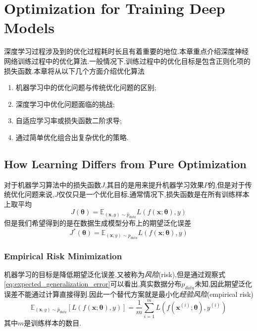 \chapter{Optimization for Training Deep Models}

深度学习过程涉及到的优化过程耗时长且有着重要的地位.本章重点介绍深度神经网络训练过程中的优化算法.一般情况下,训练过程中的优化目标是包含正则化项的损失函数.本章将从以下几个方面介绍优化算法
\begin{enumerate}
    \item 机器学习中的优化问题与传统优化问题的区别;
    \item 深度学习中优化问题面临的挑战;
    \item 自适应学习率或损失函数二阶求导;
    \item 通过简单优化组合出复杂优化的策略.
\end{enumerate}

\section{How Learning Differs from Pure Optimization}

对于机器学习算法中的损失函数$J$,其目的是用来提升机器学习效果$P$的,但是对于传统优化问题来说,$J$仅仅只是一个优化目标.通常情况下,损失函数是在所有训练样本上取平均
\begin{equation}
J(\bm\theta)=\mathbb E_{(\bm x,y)\sim\hat p_{data}}L(f(\bm x;\bm\theta),y)
\end{equation}
但是我们希望得到的是在数据生成模型分布上的期望泛化误差
\begin{equation}\label{eq:expected_generalization_error}
J^\ast(\bm\theta)=\mathbb E_{(\bm x,y)\sim p_{data}}L(f(\bm x;\bm\theta),y)
\end{equation}

\subsection{Empirical Risk Minimization}

机器学习的目标是降低期望泛化误差,又被称为\textit{风险}(risk),但是通过观察式\ref{eq:expected_generalization_error}可以看出,真实数据分布$p_{data}$未知,因此期望泛化误差不能通过计算直接得到.因此一个替代方案就是最小化\textit{经验风险}(empirical risk)
\begin{equation}
\mathbb E_{(\bm x,y)\sim\hat p_{data}}\left[L(f(\bm x;\bm\theta),y)\right]=\frac{1}{m}\sum_{i=1}^mL(f(\bm x^{(i)};\bm\theta),y^{(i)})
\end{equation}
其中$m$是训练样本的数目.


